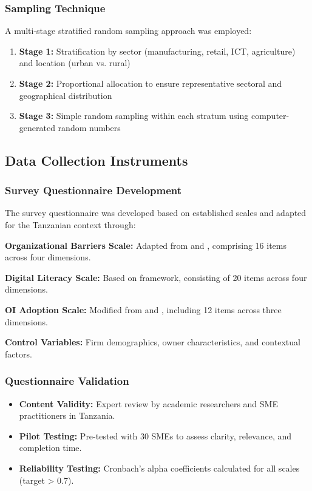 \subsubsection{Sampling Technique}
A multi-stage stratified random sampling approach was employed:
\begin{enumerate}
    \item \textbf{Stage 1:} Stratification by sector (manufacturing, retail, ICT, agriculture) and location (urban vs. rural)
    \item \textbf{Stage 2:} Proportional allocation to ensure representative sectoral and geographical distribution
    \item \textbf{Stage 3:} Simple random sampling within each stratum using computer-generated random numbers
\end{enumerate}

\subsection{Data Collection Instruments}

\subsubsection{Survey Questionnaire Development}
The survey questionnaire was developed based on established scales and adapted for the Tanzanian context through:

\textbf{Organizational Barriers Scale:} Adapted from \cite{bigliardi2012open} and \cite{morgan2006characteristics}, comprising 16 items across four dimensions.

\textbf{Digital Literacy Scale:} Based on \cite{eshet2004digital} framework, consisting of 20 items across four dimensions.

\textbf{OI Adoption Scale:} Modified from \cite{lichtenthaler2009outbound} and \cite{van2010open}, including 12 items across three dimensions.

\textbf{Control Variables:} Firm demographics, owner characteristics, and contextual factors.

\subsubsection{Questionnaire Validation}
\begin{itemize}
    \item \textbf{Content Validity:} Expert review by academic researchers and SME practitioners in Tanzania.
    \item \textbf{Pilot Testing:} Pre-tested with 30 SMEs to assess clarity, relevance, and completion time.
    \item \textbf{Reliability Testing:} Cronbach's alpha coefficients calculated for all scales (target > 0.7).
\end{itemize}

